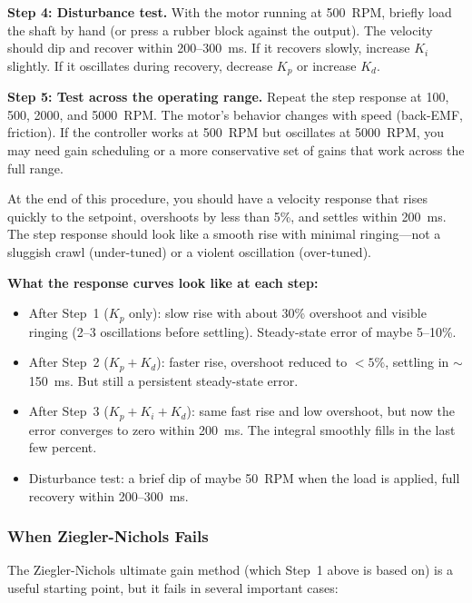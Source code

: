 \textbf{Step 4: Disturbance test.} With the motor running at 500~RPM, briefly load the shaft by hand (or press a rubber block against the output). The velocity should dip and recover within 200--300~ms. If it recovers slowly, increase $K_i$ slightly. If it oscillates during recovery, decrease $K_p$ or increase $K_d$.

\textbf{Step 5: Test across the operating range.} Repeat the step response at 100, 500, 2000, and 5000~RPM. The motor's behavior changes with speed (back-EMF, friction). If the controller works at 500~RPM but oscillates at 5000~RPM, you may need gain scheduling or a more conservative set of gains that work across the full range.

At the end of this procedure, you should have a velocity response that rises quickly to the setpoint, overshoots by less than 5\%, and settles within 200~ms. The step response should look like a smooth rise with minimal ringing---not a sluggish crawl (under-tuned) or a violent oscillation (over-tuned).

\textbf{What the response curves look like at each step:}
\begin{itemize}
    \item After Step~1 ($K_p$ only): slow rise with about 30\% overshoot and visible ringing (2--3 oscillations before settling). Steady-state error of maybe 5--10\%.
    \item After Step~2 ($K_p + K_d$): faster rise, overshoot reduced to $<5\%$, settling in $\sim$150~ms. But still a persistent steady-state error.
    \item After Step~3 ($K_p + K_i + K_d$): same fast rise and low overshoot, but now the error converges to zero within 200~ms. The integral smoothly fills in the last few percent.
    \item Disturbance test: a brief dip of maybe 50~RPM when the load is applied, full recovery within 200--300~ms.
\end{itemize}

\subsubsection{When Ziegler-Nichols Fails}

The Ziegler-Nichols ultimate gain method (which Step~1 above is based on) is a useful starting point, but it fails in several important cases:

